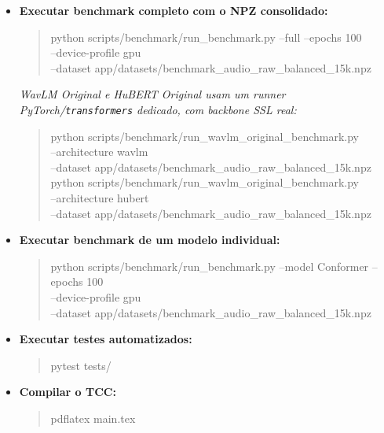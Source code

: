\documentclass[12pt,a4paper]{article}
\begin{document}
\begin{itemize}
    \item \textbf{Executar benchmark completo com o NPZ consolidado:}
    \begin{quote}\footnotesize\ttfamily
    python scripts/benchmark/run\_benchmark.py --full --epochs 100\\
    --device-profile gpu\\
    --dataset app/datasets/benchmark\_audio\_raw\_balanced\_15k.npz
    \end{quote}
    \textit{WavLM Original e HuBERT Original usam um \textit{runner}
    PyTorch/\texttt{transformers} dedicado, com \textit{backbone} SSL real:}
    \begin{quote}\footnotesize\ttfamily
    python scripts/benchmark/run\_wavlm\_original\_benchmark.py\\
    --architecture wavlm\\
    --dataset app/datasets/benchmark\_audio\_raw\_balanced\_15k.npz\\
    python scripts/benchmark/run\_wavlm\_original\_benchmark.py\\
    --architecture hubert\\
    --dataset app/datasets/benchmark\_audio\_raw\_balanced\_15k.npz
    \end{quote}

    \item \textbf{Executar benchmark de um modelo individual:}
    \begin{quote}\footnotesize\ttfamily
    python scripts/benchmark/run\_benchmark.py --model Conformer --epochs 100\\
    --device-profile gpu\\
    --dataset app/datasets/benchmark\_audio\_raw\_balanced\_15k.npz
    \end{quote}

    \item \textbf{Executar testes automatizados:}
    \begin{quote}\footnotesize\ttfamily
    pytest tests/
    \end{quote}

    \item \textbf{Compilar o TCC:}
    \begin{quote}\footnotesize\ttfamily
    pdflatex main.tex
    \end{quote}
\end{itemize}
\end{document}
